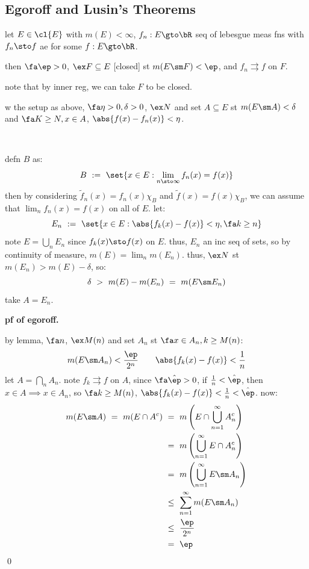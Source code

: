 \subsection{Egoroff and Lusin's Theorems}

\begin{thm}[title=Egoroff]
	let $E\in\cl{E}$ with $m(E)<\infty$,
	$f_{n}:E\gto\bR$ seq of lebesgue meas fns with $f_{n}\sto f$ ae
	for some $f:E\gto\bR$.

	then $\fa\ep>0$, $\ex F\subseteq E$ [closed] st $m(E\sm F)<\ep$, and
	$f_{n}\rightrightarrows f$ on $F$.
\end{thm}
note that by inner reg, we can take $F$ to be closed.

\begin{lm}
	w the setup as above, $\fa\eta>0,\delta>0$, $\ex N$ and set $A\subseteq E$
	st $m(E\sm A)<\delta$ and $\fa K\geq N,x\in A$, $\abs{f(x)-f_{n}(x)}<\eta$.
\end{lm} \

\begin{pf}
	defn $B$ as:
	\begin{equation*}
		B \ := \ \set{x\in E:\lim_{n\sto\infty}f_{n}(x)=f(x)}
	\end{equation*}
	then by considering $\tilde{f}_{n}(x)=f_{n}(x)\chi_{B}$ and
	$\tilde{f}(x)=f(x)\chi_{B}$, we can assume that $\lim_{n}f_{n}(x)=f(x)$ on
	all of $E$. let:
	\begin{equation*}
		E_{n} \ := \ \set{x\in E:\abs{f_{k}(x)-f(x)}<\eta,\fa k\geq n}
	\end{equation*}
	note $E=\bigcup_{n}E_{n}$ since $f_{k}(x)\sto f(x)$ on $E$.
	thus, $E_{n}$ an inc seq of sets, so by continuity of measure,
	$m(E)=\lim_{n}m(E_{n})$.
	thus, $\ex N$ st $m(E_{n})>m(E)-\delta$, so:
	\begin{equation*}
		\delta \ > \ m(E)-m(E_{n}) \ = \ m(E\sm E_{n})
	\end{equation*}
	take $A=E_{n}$.
\end{pf}

\textbf{pf of egoroff.}

by lemma, $\fa n$, $\ex M(n)$ and set $A_{n}$ st $\fa x\in A_{n},k\geq M(n)$:
\begin{equation*}
	m(E\sm A_{n})<\frac{\ep}{2^{n}} \qquad \abs{f_{k}(x)-f(x)}<\frac{1}{n}
\end{equation*}
let $A=\bigcap_{n}A_{n}$.
note $f_{k}\rightrightarrows f$ on $A$, since $\fa\hat{\ep}>0$,
if $\frac{1}{n}<\hat{\ep}$, then $x\in A \implies x\in A_{n}$, so $\fa k\geq M(n)$,
$\abs{f_{k}(x)-f(x)}<\frac{1}{n}<\hat{\ep}$.
now:
\begin{align*}
	m(E\sm A) \ = \ m(E\cap A^{c})
	& \ = \ m\left(E\cap\bigcup_{n=1}^{\infty}A_{n}^{c}\right) \\
	& \ = \ m\left(\bigcup_{n=1}^{\infty}E\cap A_{n}^{c}\right) \\
	& \ = \ m\left(\bigcup_{n=1}^{\infty}E\sm A_{n}\right) \\
	& \ \leq \ \sum_{n=1}^{\infty}m(E\sm A_{n}) \\
	& \ \leq \ \frac{\ep}{2^{n}} \\
	& \ = \ \ep
\end{align*}
\qed

